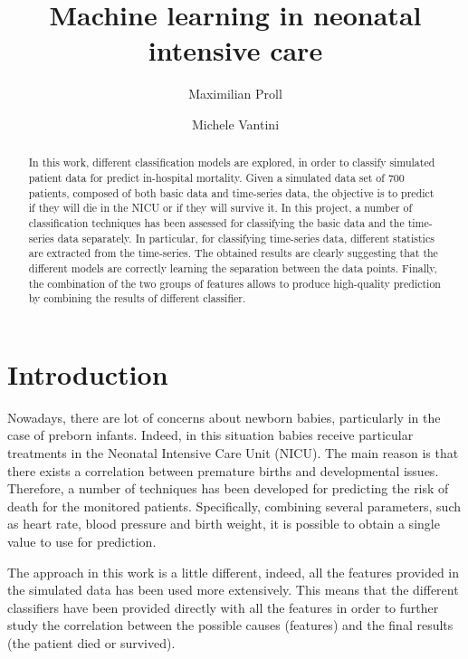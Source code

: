 \documentclass[a4paper,11pt]{article}
\begin{document}
\title{Machine learning in neonatal intensive care}

\author{Maximilian Proll \and Michele Vantini}

\maketitle


\begin{abstract}
In this work, different classification models are explored, in order to classify simulated patient data for predict in-hospital mortality. Given a simulated data set of 700 patients, composed of both basic data and time-series data, the objective is to predict if they will die in the NICU or if they will survive it.
In this project, a number of classification techniques has been assessed for classifying the basic data and the time-series data separately. In particular, for classifying time-series data, different statistics are extracted from the time-series. The obtained results are clearly suggesting that the different models are correctly learning the separation between the data points. Finally, the combination of the two groups of features allows to produce high-quality prediction by combining the results of different classifier.
\end{abstract}

\section{Introduction}
Nowadays, there are lot of concerns about newborn babies, particularly in the case of preborn infants. Indeed, in this situation babies receive particular treatments in the Neonatal Intensive Care Unit (NICU). The main reason is that there exists a correlation between premature births and developmental issues. Therefore, a number of techniques has been developed for predicting the risk of death for the monitored patients. Specifically, combining several parameters, such as heart rate, blood pressure and birth weight, it is possible to obtain a single value to use for prediction. 

The approach in this work is a little different, indeed, all the features provided in the simulated data has been used more extensively. This means that the different classifiers have been provided directly with all the features in order to further study the correlation between the possible causes (features) and the final results (the patient died or survived).
\end{document}
